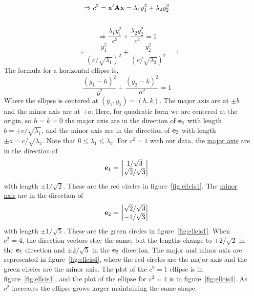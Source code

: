\begin{enumerate}[font=\bfseries]
\[        \]
        \[
            \Rightarrow
            c^2
            = 
            \bold{x}^\prime\bold{A}\bold{x}
            =
            \lambda_1y_1^2 + \lambda_2y_2^2
        \]\
        \[
            \Rightarrow
            \frac{\lambda_1y_1^2}{c^2} + \frac{\lambda_2y_2^2}{c^2}
            =
            1
        \]
        \[
            \Rightarrow
            \frac{y_1^2}{{\left(c/\sqrt{\lambda_1}\right)}^2} + \frac{y_2^2}{{\left(c/\sqrt{\lambda_2}\right)}^2}
            =
            1
        \]
        The formula for a horizontal ellipse is,
        \[
            \frac{{\left(y_1-h\right)}^2}{b^2} + \frac{{\left(y_2-k\right)}^2}{a^2} = 1
        \]
        Where the ellipse is centered at $\left(y_1, y_2\right) = \left(h, k\right)$. The major axis are at $\pm b$ and the minor axis are at $\pm a$. Here, for quadratic form we are centered at the origin, so $h = k = 0$ the major axis are in the direction of $\bold{e}_1$ with length $b = \pm c/\sqrt{\lambda_1}$, and the minor axis are in the direction of $\bold{e}_2$ with length $\pm a = c/\sqrt{\lambda_2}$. Note that $0 \le \lambda_1 \leq \lambda_2$.
        \newline
        \newline
        For $c^2 = 1$ with our data, the \underline{major axis} are in the direction of 
        \[
            \bold{e}_1 
            = 
            \begin{bmatrix}
                1/\sqrt{3} \\
                \sqrt{2}/\sqrt{3}
            \end{bmatrix}
        \] 
        with length $\pm 1/\sqrt{2}$. These are the red circles in figure~\ref{fig:ellcis1}.
        \newline
        The \underline{minor axis} are in the direction of 
        \[
            \bold{e}_2 
            = 
            \begin{bmatrix}
                \sqrt{2}/\sqrt{3} \\
                -1/\sqrt{3}
            \end{bmatrix}
        \] 
        with length $\pm 1/\sqrt{5}$. These are the green circles in figure~\ref{fig:ellcis1}.
        When $c^2 = 4$, the direction vectors stay the same, but the lengths change to $\pm 2/\sqrt{2}$ in the $\bold{e}_1$ direction and $\pm 2/\sqrt{5}$ in the $\bold{e}_2$ direction. The major and minor axis are represented in figure~\ref{fig:ellcis4}, where the red circles are the major axis and the green circles are the minor axis. The plot of the $c^2 = 1$ ellipse is in figure~\ref{fig:ellcis1}, and the plot of the ellipse for $c^2 = 4$ is in figure~\ref{fig:ellcis4}. As $c^2$ increases the ellipse grows larger maintaining the same shape.


\end{enumerate}
